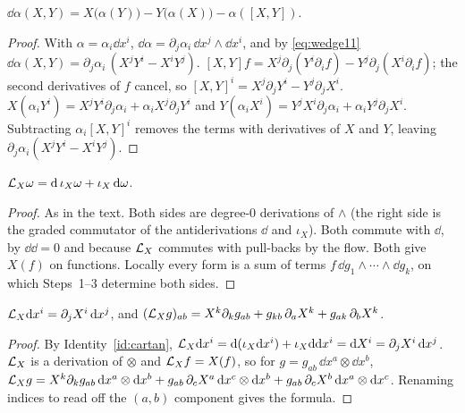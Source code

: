 \begin{identity}[invariant formula for $\dd$ of a $1$-form; Theorem~\ref{thm:dprops}(3), $k=1$]\label{id:dinvariant}
$\dd\alpha(X,Y)=X\bigl(\alpha(Y)\bigr)-Y\bigl(\alpha(X)\bigr)-\alpha([X,Y])$.
\end{identity}
\begin{proof}
 With $\alpha=\alpha_i\dd x^i$, $\dd\alpha=\partial_j\alpha_i\,\dd x^j\wedge\dd x^i$, and by \eqref{eq:wedge11}
$\dd\alpha(X,Y)=\partial_j\alpha_i\,(X^jY^i-X^iY^j)$.
 $[X,Y]f=X^j\partial_j(Y^i\partial_if)-Y^j\partial_j(X^i\partial_if)$; the second derivatives of $f$ cancel, so
$[X,Y]^i=X^j\partial_jY^i-Y^j\partial_jX^i$.
 $X(\alpha_iY^i)=X^jY^i\partial_j\alpha_i+\alpha_iX^j\partial_jY^i$ and $Y(\alpha_iX^i)=Y^jX^i\partial_j\alpha_i+\alpha_iY^j\partial_jX^i$.
Subtracting $\alpha_i[X,Y]^i$ removes the terms with derivatives of $X$ and $Y$, leaving $\partial_j\alpha_i(X^jY^i-X^iY^j)$.
\end{proof}

\begin{identity}\label{id:cartan}
$\mathcal{L}_X\omega=\mathrm{d}\,\iota_X\omega+\iota_X\,\mathrm{d}\omega$.
\end{identity}
\begin{proof}
As in the text.
 Both sides are degree-$0$ derivations of $\wedge$ (the right side is the graded commutator of the
antiderivations $\dd$ and $\iota_X$).
 Both commute with $\dd$, by $\dd\dd=0$ and because $\mathcal{L}_X$ commutes with pull-backs by the flow.
 Both give $X(f)$ on functions.
 Locally every form is a sum of terms $f\,\dd g_1\wedge\cdots\wedge\dd g_k$, on which Steps~1--3 determine both sides.
\end{proof}

\begin{identity}\label{id:liedx}
$\mathcal{L}_X\mathrm{d} x^i=\partial_jX^i\,\mathrm{d} x^j$, and $(\mathcal{L}_Xg)_{ab}=X^k\partial_kg_{ab}+g_{kb}\,\partial_aX^k+g_{ak}\,\partial_bX^k$.
\end{identity}
\begin{proof}
 By Identity~\ref{id:cartan}, $\mathcal{L}_X\mathrm{d} x^i=\mathrm{d}(\iota_X\mathrm{d} x^i)+\iota_X\mathrm{d}\mathrm{d} x^i=\mathrm{d} X^i=\partial_jX^i\,\mathrm{d} x^j$.
 $\mathcal{L}_X$ is a derivation of $\otimes$ and $\mathcal{L}_Xf=X(f)$, so for $g=g_{ab}\,\dd x^a\otimes\dd x^b$,
$\mathcal{L}_Xg=X^k\partial_kg_{ab}\,\mathrm{d} x^a\otimes\mathrm{d} x^b+g_{ab}\,\partial_cX^a\,\mathrm{d} x^c\otimes\mathrm{d} x^b+g_{ab}\,\partial_cX^b\,\mathrm{d} x^a\otimes\mathrm{d} x^c$.
Renaming indices to read off the $(a,b)$ component gives the formula.
\end{proof}

